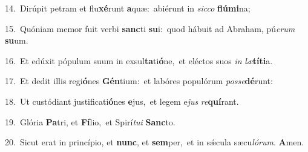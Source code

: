 {\numbfont\textcolor{\numbcolor}{14.}}~Dirúpit petram et flu\-\textbf{xé}\-runt \textbf{a}\-quæ:~\star abiérunt in \textit{sic}\-\textit{co} \textbf{flú}\-\textbf{mi}na;\par
{\numbfont\textcolor{\numbcolor}{15.}}~Quóniam memor fuit verbi \textbf{sanc}\-ti \textbf{su}\-i:~\star quod hábuit ad Abraham, pú\-\textit{e}\-\textit{rum} \textbf{su}\-um.\par
{\numbfont\textcolor{\numbcolor}{16.}}~Et edúxit pópulum suum in exsul\-\textbf{ta}\-ti\-\textbf{ó}\-ne,~\star et eléctos suos \textit{in} \textit{læ}\-\textbf{tí}\textbf{ti}a.\par
{\numbfont\textcolor{\numbcolor}{17.}}~Et dedit illis regi\-\textbf{ó}\-nes \textbf{Gén}\-tium:~\star et labóres populórum \textit{pos}\-\textit{se}\textbf{dé}runt:\par
{\numbfont\textcolor{\numbcolor}{18.}}~Ut custódiant justificati\-\textbf{ó}\-nes \textbf{e}\-jus,~\star et legem e\textit{jus} \textit{re}\-\textbf{quí}rant.\par
{\numbfont\textcolor{\numbcolor}{19.}}~Glória \textbf{Pa}\-tri, et \textbf{Fí}\-lio,~\star et Spirí\-\textit{tu}\-\textit{i} \textbf{Sanc}\-to.\par
{\numbfont\textcolor{\numbcolor}{20.}}~Sicut erat in princípio, et \textbf{nunc}\-, et \textbf{sem}\-per,~\star et in sǽcula sæcu\-\textit{ló}\-\textit{rum}. \textbf{A}\-men.\par
